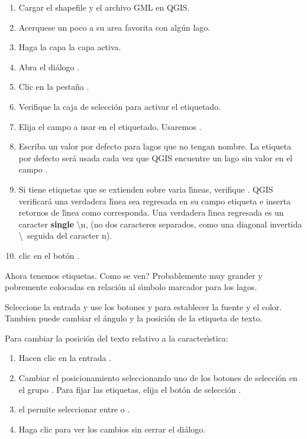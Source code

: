\begin{enumerate}
\item Cargar el shapefile  y el archivo GML  en QGIS.
\item Acerquese un poco a su area favorita con alg\'un lago.
\item Haga la capa  la capa activa.
\item Abra el di\'alogo .
\item Clic en la pesta\~na .
\item Verifique la caja de selecci\'on  para activar el etiquetado.
\item Elija el campo a usar en el etiquetado. 
  Usaremos .
\item Escriba un valor por defecto para lagos que no tengan nombre. La etiqueta por defecto ser\'a
  usada cada vez que QGIS encuentre un lago sin valor en el campo .
\item Si tiene etiquetas que se extienden sobre varia l\'{\i}neas, verifique . 
QGIS verificar\'a una verdadera l\'{\i}nea sea regresada en su campo etiqueta e inserta retornos de l\'{\i}nea como corresponda.
Una verdadera l\'{\i}nea regresada es un caracter \textbf{single} \textbackslash n, 
(no dos caracteres separados, como una diagonal invertida \textbackslash ~seguida del caracter n).
\item clic en el bot\'on .
\end{enumerate} 

Ahora tenemos etiquetas. Como se ven? Probablemente muy grander y pobremente colocadas en relaci\'on al s\'{\i}mbolo
marcador para los lagos.

Seleccione la entrada  y use los botones   y 
para establecer la fuente y el color. Tambien puede cambiar el \'angulo y la posici\'on de la etiqueta de texto.


Para cambiar la posici\'on del texto relativo a la caracter\'{\i}stica:

\begin{enumerate} 
\item Hacen clic en la entrada .
\item Cambiar el posicionamiento seleccionando uno de los botones de selecci\'on
en el grupo . Para fijar las etiquetas, elija el bot\'on de selecci\'on
.
\item el  permite seleccionar entre
 o .
\item Haga clic  para ver los cambios sin cerrar el di\'alogo.
\end{enumerate} 

